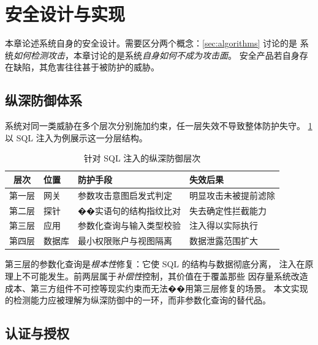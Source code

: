 \section{安全设计与实现}
\label{sec:security}

本章论述系统自身的安全设计。需要区分两个概念：\cref{sec:algorithms} 讨论的是
系统\emph{如何检测攻击}，本章讨论的是系统\emph{自身如何不成为攻击面}。
安全产品若自身存在缺陷，其危害往往甚于被防护的威胁。

\subsection{纵深防御体系}

系统对同一类威胁在多个层次分别施加约束，任一层失效不导致整体防护失守。
\cref{tab:defense-depth} 以 SQL 注入为例展示这一分层结构。

\begin{table}[htbp]
\centering
\caption{针对 SQL 注入的纵深防御层次}
\label{tab:defense-depth}
\small
\begin{tabular}{@{}c l l l@{}}
\toprule
\textbf{层次} & \textbf{位置} & \textbf{防护手段} & \textbf{失效后果} \\
\midrule
第一层 & 网关 & 参数攻击意图启发式判定 & 明显攻击未被提前滤除 \\
第二层 & 探针 & ��实语句的结构指纹比对 & 失去确定性拦截能力 \\
第三层 & 应用 & 参数化查询与输入类型校验 & 注入得以实际执行 \\
第四层 & 数据库 & 最小权限账户与视图隔离 & 数据泄露范围扩大 \\
\bottomrule
\end{tabular}
\end{table}

\begin{remark}
第三层的参数化查询是\emph{根本性}修复：它使 SQL 的结构与数据彻底分离，
注入在原理上不可能发生。前两层属于\emph{补偿性}控制，其价值在于覆盖那些
因存量系统改造成本、第三方组件不可控等现实约束而无法��用第三层修复的场景。
本文实现的检测能力应被理解为纵深防御中的一环，而非参数化查询的替代品。
\end{remark}

\subsection{认证与授权}

